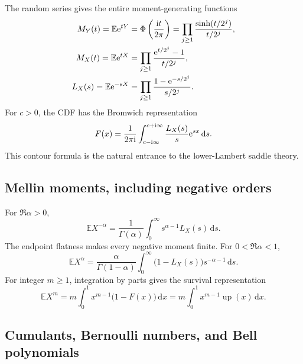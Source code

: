 \documentclass[11pt]{article}
\theoremstyle{definition}
\theoremstyle{remark}
\newcommand{\E}{\mathbb E}
\newcommand{\dd}{\,\mathrm d}
\newcommand{\Up}{\operatorname{up}}
\begin{document}
The random series gives the entire moment-generating functions
\begin{align}
 M_Y(t)=\E\e^{tY}
 &=\Phi\left(\frac{\ii t}{2\pi}\right)
 =\prod_{j\ge1}\frac{\sinh(t/2^j)}{t/2^j},               \label{p2:eq:MY}\\
 M_X(t)=\E\e^{tX}
 &=\prod_{j\ge1}\frac{\e^{t/2^j}-1}{t/2^j},             \label{p2:eq:MX}\\
 L_X(s)=\E\e^{-sX}
 &=\prod_{j\ge1}\frac{1-\e^{-s/2^j}}{s/2^j}.           \label{p2:eq:LX}
\end{align}
For $c>0$, the CDF has the Bromwich representation
\begin{equation}
 F(x)=\frac{1}{2\pi\ii}\int_{c-\ii\infty}^{c+\ii\infty}
 \frac{L_X(s)}{s}\e^{sx}\dd s.                          \label{p2:eq:F-Bromwich}
\end{equation}
This contour formula is the natural entrance to the lower-Lambert saddle theory.

\subsection{Mellin moments, including negative orders}

For $\Re\alpha>0$,
\begin{equation}
 \E X^{-\alpha}=\frac{1}{\Gamma(\alpha)}
 \int_0^\infty s^{\alpha-1}L_X(s)\dd s.                 \label{p2:eq:negative-moment-Mellin}
\end{equation}
The endpoint flatness makes every negative moment finite.  For $0<\Re\alpha<1$,
\begin{equation}
 \E X^{\alpha}=\frac{\alpha}{\Gamma(1-\alpha)}
 \int_0^\infty\bigl(1-L_X(s)\bigr)s^{-\alpha-1}\dd s. \label{p2:eq:positive-fractional-moment}
\end{equation}
For integer $m\ge1$, integration by parts gives the survival representation
\begin{equation}
 \E X^m=m\int_0^1x^{m-1}\bigl(1-F(x)\bigr)\dd x
 =m\int_0^1x^{m-1}\Up(x)\dd x.                          \label{p2:eq:moments-survival}
\end{equation}

\subsection{Cumulants, Bernoulli numbers, and Bell polynomials}
\end{document}
